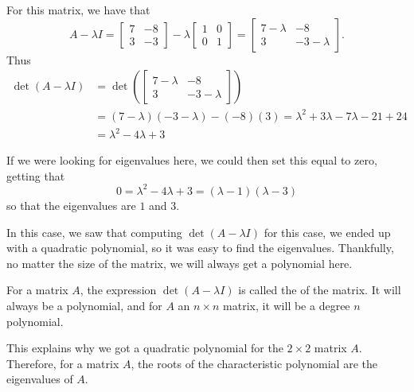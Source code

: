 \documentclass{ximera}
\begin{document}
\begin{exampleSol}
    For this matrix, we have that 
    \[ 
        A - \lambda I = 
        \begin{bmatrix} 
            7 & -8 \\ 
            3 & -3 
        \end{bmatrix} 
        - \lambda 
        \begin{bmatrix} 
            1 & 0 \\ 
            0 & 1 
        \end{bmatrix} 
        = 
        \begin{bmatrix} 
            7-\lambda & -8 \\ 
            3 & -3-\lambda 
        \end{bmatrix}. 
    \]
    Thus
    \[ 
        \begin{split}
            \det(A - \lambda I) &= \det\left(\begin{bmatrix} 7-\lambda & -8 \\ 3 & -3-\lambda \end{bmatrix}\right) \\
            &= (7-\lambda)(-3-\lambda) - (-8)(3) = \lambda^2 + 3\lambda - 7\lambda - 21 +24 \\
            &= \lambda^2 - 4\lambda + 3
        \end{split}
    \]
    
    If we were looking for eigenvalues here, we could then set this equal to zero, getting that
    \[ 
        0 = \lambda^2 - 4\lambda+ 3 = (\lambda -1)(\lambda -3) 
    \] 
    so that the eigenvalues are $1$ and $3$. 
\end{exampleSol}

In this case, we saw that computing $\det(A - \lambda I)$ for this case, we ended up with a quadratic polynomial, so it was easy to find the eigenvalues. Thankfully, no matter the size of the matrix, we will always get a polynomial here. 

\begin{definition}
    For a matrix $A$, the expression $\det(A - \lambda I)$ is called the \emph{} of the matrix. It will always be a polynomial, and for $A$ an $n \times n$ matrix, it will be a degree $n$ polynomial.
\end{definition}
This explains why we got a quadratic polynomial for the $2 \times 2$ matrix $A$. Therefore, for a matrix $A$, the roots of the characteristic polynomial are the eigenvalues of $A$. 
\end{document}
